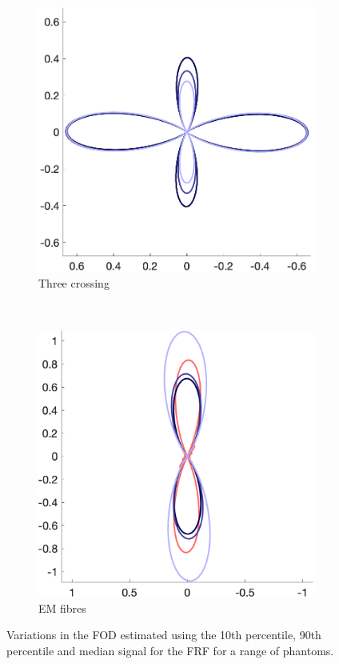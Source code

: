 \begin{figure}
  \begin{subfigure}[]{0.4\textwidth}
    \includegraphics[width=\textwidth]{figures/frf_experiment/threeperp_fod_b_3000.png}
    \caption{Three crossing}
  \end{subfigure}
  ~
  \begin{subfigure}[]{0.4\textwidth}
    \includegraphics[width=\textwidth]{figures/frf_experiment/EMfibres_fod_b_3000.png}
    \caption{\ac{EM} fibres}
  \end{subfigure}

  \caption[Imapct of the FRF variability on FOD estimation]{Variations in the \ac{FOD} estimated using the 10th percentile, 90th percentile and median signal for the \ac{FRF} for a range of phantoms.}
  \label{fig:frf_fod_kappa_b2000}
\end{figure}


